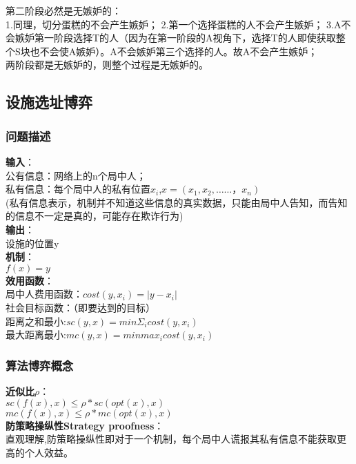 \documentclass[11pt]{ctexart}
\begin{document}
第二阶段必然是无嫉妒的：\\
1.同理，切分蛋糕的不会产生嫉妒；
2.第一个选择蛋糕的人不会产生嫉妒；
3.A不会嫉妒第一阶段选择T的人（因为在第一阶段的A视角下，选择T的人即使获取整个S块也不会使A嫉妒）。A不会嫉妒第三个选择的人。故A不会产生嫉妒；\\

两阶段都是无嫉妒的，则整个过程是无嫉妒的。\\


\subsection{设施选址博弈}

\subsubsection{问题描述}
\textbf{输入}：\\
公有信息：网络上的n个局中人；\\
私有信息：每个局中人的私有位置$x_i$,$x=(x_1,x_2,……，x_n)$\\
(私有信息表示，机制并不知道这些信息的真实数据，只能由局中人告知，而告知的信息不一定是真的，可能存在欺诈行为)\\

\textbf{输出}：\\
设施的位置y\\

\textbf{机制}：\\
$f(x)=y$\\

\textbf{效用函数}：\\
局中人费用函数：$cost(y,x_i)=|y-x_i|$\\

社会目标函数：（即要达到的目标）\\
距离之和最小:$sc(y,x)=min\Sigma_i cost(y,x_i)$\\
最大距离最小:$mc(y,x)=min max_i cost(y,x_i)$\\

\subsubsection{算法博弈概念}
\textbf{近似比$\rho$}：\\

$sc(f(x),x) \leq \rho*sc(opt(x),x)$\\
$mc(f(x),x) \leq \rho*mc(opt(x),x)$\\


\textbf{防策略操纵性Strategy proofness}：\\
直观理解,防策略操纵性即对于一个机制，每个局中人谎报其私有信息不能获取更高的个人效益。\\
\end{document}
